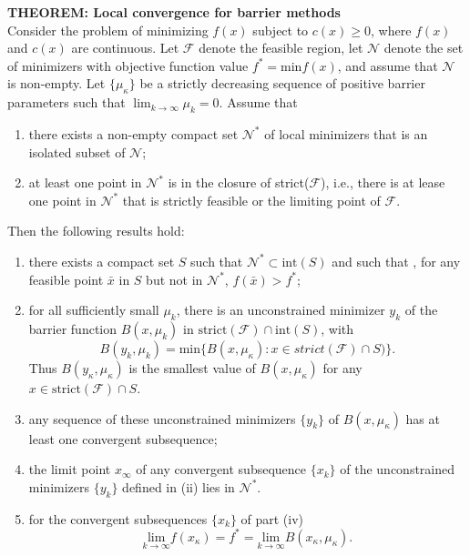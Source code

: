 \documentclass[14pt]{extreport}
\begin{document}
\textbf{THEOREM: Local convergence for barrier methods}\\
Consider the problem of minimizing $f(x)$ subject to $c(x) \ge 0$, where $f(x)$ and $c(x)$ are continuous. Let $\mathcal{F}$ denote the feasible region, let $\mathcal{N}$ denote the set of minimizers with objective function value $f^* = \text{min} f(x)$, and assume that $\mathcal{N}$ is non-empty.  Let $\{ \mu_{\kappa}\}$ be a strictly decreasing sequence of  positive barrier parameters such that $\lim_{k \to \infty} \mu_{k} = 0$. Assume that 
\begin{enumerate}[label=(\alph*)]
	\item there exists a non-empty compact set $\mathcal{N}^*$ of local minimizers that is an isolated subset of $\mathcal{N}$;
	\item at  least one point in $\mathcal{N}^*$ is in the closure of strict($\mathcal{F}$), i.e.,  there is at lease one point in $\mathcal{N}^*$ that is strictly feasible or the limiting point of $\mathcal{F}$.
\end{enumerate}
Then the following results hold:
\begin{enumerate}[label=(\roman*)]
	\item there exists a compact set $S$ such that $\mathcal{N}^* \subset \text{int}(S)$ and such that , for any feasible point $\bar{x}$ in $S$ but not in $\mathcal{N}^*$, $f(\bar{x}) > f^*$;
	\item for all sufficiently small $\mu_{k}$, there is an unconstrained minimizer $y_k$ of the barrier function $B(x, \mu_{k})$ in $\text{strict}(\mathcal{F}) \cap \text{int}(S)$, with
	$$B(y_k, \mu_{k}) = \text{min} \{ B(x, \mu_{\kappa}) : x \in strict(\mathcal{F}) \cap S)\}.$$ Thus $B(y_{\kappa}, \mu_{\kappa})$ is the smallest value of $B(x, \mu_{\kappa})$ for any $x \in \text{strict}(\mathcal{F}) \cap S$.
	\item any sequence of these unconstrained minimizers $\{ y_{k}\}$ of $B(x , \mu_{\kappa})$ has at least one convergent subsequence;
	\item the limit point $x_{\infty}$ of any convergent subsequence $\{x_{k}\}$ of the unconstrained minimizers $\{ y_{k}\}$ defined in (ii) lies in $\mathcal{N}^*$.
	\item for the convergent subsequences $\{ x_k\}$ of part (iv)
	$$\underset{k \to \infty}{\text{lim}}f(x_{\kappa}) =  f^* = \underset{k \to \infty}{\text{lim}} B(x_{\kappa}, \mu_{\kappa}).$$
\end{enumerate}
\end{document}
